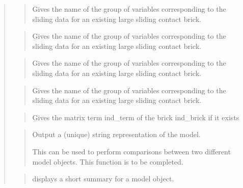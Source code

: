 \documentclass[a4paper,11pt,english]{sphinxmanual}
\begin{document}
\begin{quote}
\begin{quote}
Gives the name of the group of variables corresponding to the
sliding data for an existing large sliding contact brick.
\end{quote}

\begin{quote}

Gives the name of the group of variables corresponding to the
sliding data for an existing large sliding contact brick.
\end{quote}

\begin{quote}

Gives the name of the group of variables corresponding to the
sliding data for an existing large sliding contact brick.
\end{quote}

\begin{quote}

Gives the name of the group of variables corresponding to the
sliding data for an existing large sliding contact brick.
\end{quote}

\begin{quote}

Gives the matrix term ind\_term of the brick ind\_brick if it exists
\end{quote}

\begin{quote}

Output a (unique) string representation of the model.

This can be used to perform comparisons between two
different model objects.
This function is to be completed.
\end{quote}

\begin{quote}

displays a short summary for a model object.
\end{quote}
\end{quote}
\end{document}
